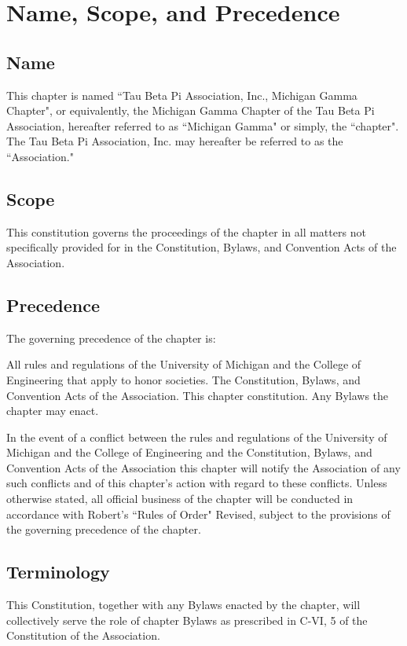 \chapter{Name, Scope, and Precedence}

\section{Name}
This chapter is named ``Tau Beta Pi Association, Inc., Michigan Gamma Chapter", or equivalently, the Michigan Gamma Chapter of the Tau Beta Pi Association, hereafter referred to as ``Michigan Gamma" or simply, the ``chapter". The Tau Beta Pi Association, Inc. may hereafter be referred to as the ``Association."

\section{Scope}
This constitution governs the proceedings of the chapter in all matters not specifically provided for in the Constitution, Bylaws, and Convention Acts of the Association.
\section{Precedence} The governing precedence of the chapter is:

\begin{compactenum}[1.]
\itemnotoc  All rules and regulations of the University of Michigan and the College of Engineering that apply to honor societies.
\itemnotoc  The Constitution, Bylaws, and Convention Acts of the Association.
\itemnotoc This chapter constitution.
\itemnotoc Any Bylaws the chapter may enact.
\end{compactenum}

In the event of a conflict between  the rules and regulations of the University of Michigan and the College of Engineering and the Constitution, Bylaws, and Convention Acts of the Association this chapter will notify the Association of any such conflicts and of this chapter's action with regard to these conflicts. Unless otherwise stated, all official business of the chapter will  be conducted in accordance with Robert's ``Rules of Order" Revised, subject to the provisions of the governing precedence of the chapter.

\section{Terminology} This Constitution, together with any Bylaws enacted by the chapter, will collectively serve the role of chapter Bylaws as prescribed in C-VI, 5 of the Constitution of the Association.

